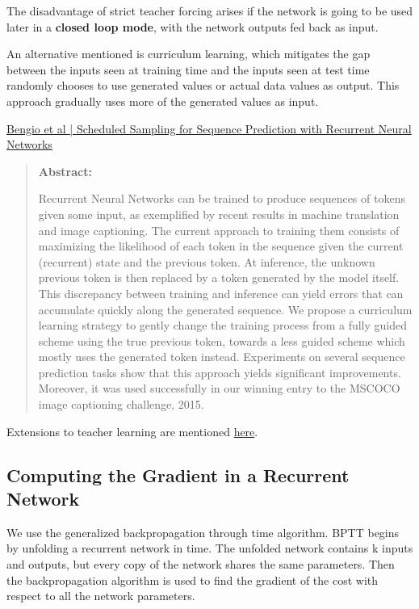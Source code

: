 \documentclass[letterpaper, 12pt]{report}
\begin{document}
The disadvantage of strict teacher forcing arises if the network is going to be used later in a \textbf{closed loop mode}, with the network outputs fed back as input. 

An alternative mentioned is curriculum learning, which mitigates the gap between the inputs seen at training time and the inputs seen at test time randomly chooses to use generated values or actual data values as output. This approach gradually uses more of the generated values as input. 

\href{https://arxiv.org/pdf/1506.03099.pdf}{Bengio et al | Scheduled Sampling for Sequence Prediction with Recurrent Neural Networks}

\begin{quote}
  \textbf{Abstract: }

  Recurrent Neural Networks can be trained to produce sequences of
  tokens given some input, as exemplified by recent results in machine
  translation and image captioning. The current approach to training
  them consists of maximizing the likelihood of each token in the
  sequence given the current (recurrent) state and the previous
  token. At inference, the unknown previous token is then replaced by
  a token generated by the model itself. This discrepancy between
  training and inference can yield errors that can accumulate quickly
  along the generated sequence.  We propose a curriculum learning
  strategy to gently change the training process from a fully guided
  scheme using the true previous token, towards a less guided scheme
  which mostly uses the generated token instead. Experiments on
  several sequence prediction tasks show that this approach yields
  significant improvements.  Moreover, it was used successfully in our
  winning entry to the MSCOCO image captioning challenge, 2015.

\end{quote}

Extensions to teacher learning are mentioned \href{https://machinelearningmastery.com/teacher-forcing-for-recurrent-neural-networks/}{here}. 

\subsection{Computing the Gradient in a Recurrent Network}

We use the generalized backpropagation through time algorithm. BPTT begins by unfolding a recurrent network in time. The unfolded network contains k inputs and outputs, but every copy of the network shares the same parameters. Then the backpropagation algorithm is used to find the gradient of the cost with respect to all the network parameters. 
\end{document}
